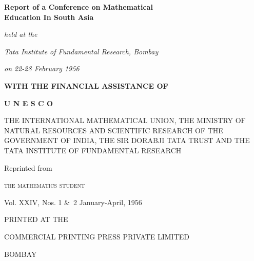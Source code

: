 \thispagestyle{empty}

\begin{center}
{\Large\bf Report of a Conference on Mathematical}\\[5pt]
{\Large\bf Education In South Asia}
\vfill

{\em held at the}
\smallskip

{\em Tata Institute of Fundamental Research, Bombay}
\smallskip

{\em on 22-28 February 1956}
\vfill

{\bf WITH THE FINANCIAL ASSISTANCE OF}
\medskip

{\bf U N E S C O}
\end{center}

\noindent
{\parfillskip=0pt
THE INTERNATIONAL MATHEMATICAL UNION, THE MINISTRY OF NATURAL RESOURCES AND SCIENTIFIC RESEARCH OF THE GOVERNMENT OF INDIA, THE SIR DORABJI TATA TRUST AND THE TATA INSTITUTE OF FUNDAMENTAL RESEARCH \par}


\eject

\thispagestyle{empty}
\begin{center}
Reprinted from

\textsc{the mathematics student}

Vol. XXIV, Nos. 1 \&\ 2 January-April, 1956
\end{center}
\vfill

\begin{center}
{\fontsize{9pt}{11pt}\selectfont
PRINTED AT THE

COMMERCIAL PRINTING PRESS PRIVATE LIMITED

BOMBAY}\relax
\end{center}
